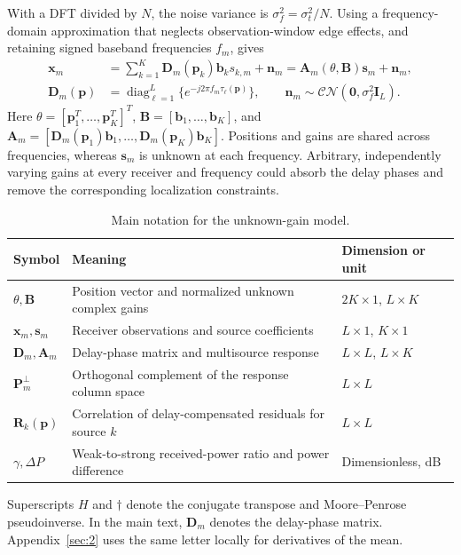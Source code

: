 With a DFT divided by $N$, the noise variance is $\sigma_f^2=\sigma_t^2/N$. Using a frequency-domain approximation that neglects observation-window edge effects\cite{ref04,ref05}, and retaining signed baseband frequencies $f_m$, gives
\begin{equation}\label{eq:ug-model}
\begin{aligned}
\mathbf x_m&=\sum_{k=1}^K\mathbf D_m(\mathbf p_k)\mathbf b_k s_{k,m}+\mathbf n_m
=\mathbf A_m(\theta,\mathbf B)\mathbf s_m+\mathbf n_m,\\
\mathbf D_m(\mathbf p)&=\operatorname{diag}_{\ell=1}^L
\{e^{-j2\pi f_m\tau_\ell(\mathbf p)}\},\qquad
\mathbf n_m\sim\mathcal{CN}(\mathbf0,\sigma_f^2\mathbf I_L).
\end{aligned}
\end{equation}
Here $\theta=[\mathbf p_1^T,\ldots,\mathbf p_K^T]^T$, $\mathbf B=[\mathbf b_1,\ldots,\mathbf b_K]$, and $\mathbf A_m=[\mathbf D_m(\mathbf p_1)\mathbf b_1,\ldots,\mathbf D_m(\mathbf p_K)\mathbf b_K]$. Positions and gains are shared across frequencies, whereas $\mathbf s_m$ is unknown at each frequency. Arbitrary, independently varying gains at every receiver and frequency could absorb the delay phases and remove the corresponding localization constraints.

\begin{table}[!htbp]
\centering\caption{Main notation for the unknown-gain model.}\label{tab:ug-symbols}
\small\renewcommand{\arraystretch}{1.15}
\begin{tabularx}{\linewidth}{Y{.8}Y{1.5}Y{.7}}
\toprule Symbol & Meaning & Dimension or unit\\\midrule
$\theta,\mathbf B$ & Position vector and normalized unknown complex gains & $2K\times1$, $L\times K$\\
$\mathbf x_m,\mathbf s_m$ & Receiver observations and source coefficients & $L\times1$, $K\times1$\\
$\mathbf D_m,\mathbf A_m$ & Delay-phase matrix and multisource response & $L\times L$, $L\times K$\\
$\mathbf P_m^\perp$ & Orthogonal complement of the response column space & $L\times L$\\
$\mathbf R_k(\mathbf p)$ & Correlation of delay-compensated residuals for source $k$ & $L\times L$\\
$\gamma,\Delta P$ & Weak-to-strong received-power ratio and power difference & Dimensionless, dB\\
\bottomrule\end{tabularx}
\end{table}
Superscripts $H$ and $\dagger$ denote the conjugate transpose and Moore--Penrose pseudoinverse. In the main text, $\mathbf D_m$ denotes the delay-phase matrix. Appendix~\ref{sec:2} uses the same letter locally for derivatives of the mean.

